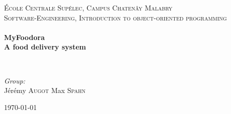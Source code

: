 \begin{titlepage}
\begin{center}



\textsc{\LARGE École Centrale Supélec, Campus Chatenây Malabry}\\[1.5cm]

\textsc{\Large Software-Engineering, Introduction to object-oriented programming}\\[0.5cm]

\HRule \\[0.4cm]
{ \huge \bfseries MyFoodora \\ A food delivery system \\[0.4cm] }

\HRule \\[1.5cm]

\begin{center} \large
\emph{Group:}\\
Jérémy \textsc{Augot}
Max \textsc{Spahn}
\end{center}

\vfill

{\large \today}

\end{center}
\end{titlepage}

